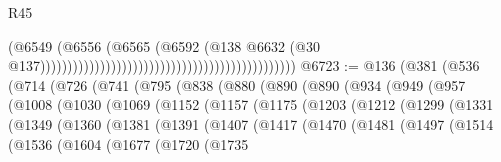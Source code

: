 \begin{lexlean}{R45}
\begin{coremodule}
{                                                                                      (@6549
                                                                                        (@6556
                                                                                          (@6565
                                                                                            (@6592
                                                                                              (@138
                                                                                                @6632
                                                                                                (@30
                                                                                                  @137)))))))))))))))))))))))))))))))))))))))))))))))
@6723 := @136
    (@381
      (@536
        (@714
          (@726
            (@741
              (@795
                (@838
                  (@880
                    (@890
                      (@890
                        (@934
                          (@949
                            (@957
                              (@1008
                                (@1030
                                  (@1069
                                    (@1152
                                      (@1157
                                        (@1175
                                          (@1203
                                            (@1212
                                              (@1299
                                                (@1331
                                                  (@1349
                                                    (@1360
                                                      (@1381
                                                        (@1391
                                                          (@1407
                                                            (@1417
                                                              (@1470
                                                                (@1481
                                                                  (@1497
                                                                    (@1514
                                                                      (@1536
                                                                        (@1604
                                                                          (@1677
                                                                            (@1720
                                                                              (@1735
}
\end{coremodule}
\end{lexlean}
